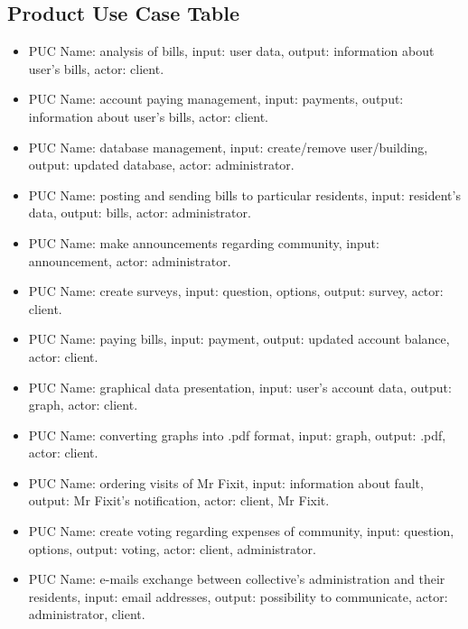 \documentclass[a4paper,10pt]{report}
\begin{document}
\subsection{Product Use Case Table}
\begin{itemize}
\item PUC Name: analysis of bills,
input: user data,
output: information about user's bills,
actor: client.

\item PUC Name: account paying management,
input: payments,
output: information about user's bills,
actor: client.

\item PUC Name: database management,
input: create/remove user/building,
output: updated database,
actor: administrator.

\item PUC Name: posting and sending bills to particular residents,
input: resident's data,
output: bills,
actor: administrator.

\item PUC Name: make announcements regarding community,
input: announcement,
actor: administrator.

\item PUC Name: create surveys,
input: question, options,
output: survey,
actor: client.

\item PUC Name: paying bills,
input: payment,
output: updated account balance,
actor: client.

\item PUC Name: graphical data presentation,
input: user's account data,
output: graph,
actor: client.

\item PUC Name: converting graphs into .pdf format,
input: graph,
output: .pdf,
actor: client.

\item PUC Name: ordering visits of Mr Fixit,
input: information about fault,
output: Mr Fixit's notification,
actor: client, Mr Fixit.

\item PUC Name: create voting regarding expenses of community, 
input: question, options,
output: voting,
actor: client, administrator.

\item PUC Name: e-mails exchange between collective’s administration and their residents, 
input: email addresses,
output: possibility to communicate,
actor: administrator, client.
\end{itemize}
\end{document}
